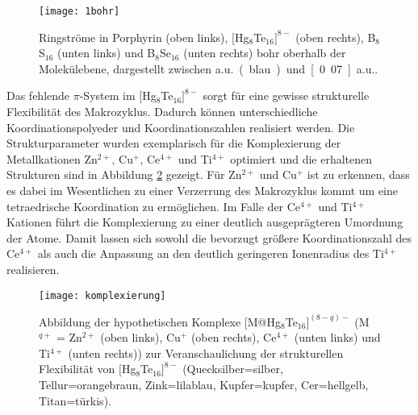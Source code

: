  

\begin{figure}[ht!]
	\centering
	\texttt{[image: 1bohr]}
	\captionsetup{figurewithin = chapter}
	\captionsetup{font=small, labelfont=bf}\caption[{Ringströme in Porphyrin, $[$Hg$_8$Te$_{16}]^{8-}$, B$_8$S$_{16}$ und B$_8$Se$_{16}$}]{Ringströme in Porphyrin (oben links), $[$Hg$_8$Te$_{16}]^{8-}$ (oben rechts), B$_8$S$_{16}$ (unten links) und B$_8$Se$_{16}$ (unten rechts) \unit[1]{bohr} oberhalb der Molekülebene, dargestellt zwischen \unit[0]{a.u.} (blau) und \unit[0.07]{a.u.}.}
\label{abb:lic}
\end{figure}

\FloatBarrier
Das fehlende $\pi$-System im $[$Hg$_8$Te$_{16}]^{8-}$ sorgt für eine gewisse strukturelle Flexibilität des Makrozyklus. Dadurch können unterschiedliche Koordinationspolyeder und Koordinationszahlen realisiert werden. Die Strukturparameter wurden exemplarisch für die Komplexierung der Metallkationen Zn$^{2+}$, Cu$^+$, Ce$^{4+}$ und Ti$^{4+}$ optimiert und die erhaltenen Strukturen sind in Abbildung \ref{abb:komplexierung} gezeigt. Für Zn$^{2+}$ und Cu$^+$ ist zu erkennen, dass es dabei im Wesentlichen zu einer Verzerrung des Makrozyklus kommt um eine tetraedrische Koordination zu ermöglichen. Im Falle der Ce$^{4+}$ und Ti$^{4+}$ Kationen führt die Komplexierung zu einer deutlich ausgeprägteren Umordnung der Atome. Damit lassen sich sowohl die bevorzugt größere Koordinationszahl des Ce$^{4+}$ als auch die Anpassung an den deutlich geringeren Ionenradius des Ti$^{4+}$ realisieren.

\begin{figure}[ht!]
	\centering
	\texttt{[image: komplexierung]}
	\captionsetup{figurewithin = chapter}
	\captionsetup{font=small, labelfont=bf}\caption[{Abbildungen der hypothetischen Komplexe [M@Hg$_8$Te$_{16}]^{(8-q)-}$ (M$^{q+}$ = Zn$^{2+}$, Cu$^+$ , Ce$^{4+}$ und Ti$^{4+}$)}]{{Abbildung der hypothetischen Komplexe [M@Hg$_8$Te$_{16}]^{(8-q)-}$ (M$^{q+}$ = Zn$^{2+}$ (oben links), Cu$^+$ (oben rechts), Ce$^{4+}$ (unten links) und Ti$^{4+}$ (unten rechts))} zur Veranschaulichung der strukturellen Flexibilität von $[$Hg$_8$Te$_{16}]^{8-}$ (Quecksilber=silber, Tellur=orangebraun, Zink=lilablau, Kupfer=kupfer, Cer=hellgelb, Titan=türkis). }
\label{abb:komplexierung}
\end{figure}

